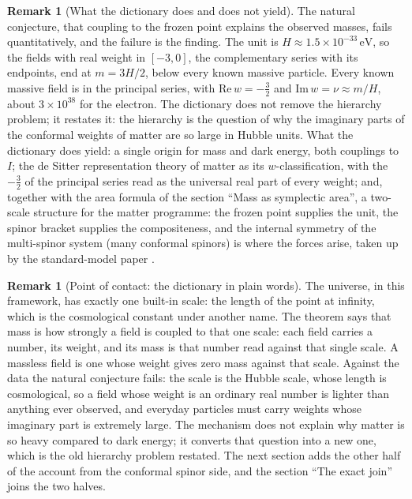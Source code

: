 \documentclass[11pt]{article}
\theoremstyle{definition}
\newtheorem{remark}[theorem]{Remark}
\theoremstyle{plain}
\newcommand{\changedmark}[2]{\marginpar{\raggedright\scriptsize\color{#1}#2}}
\begin{document}
\begin{remark}[What the dictionary does and does not yield]\label{c:note.mass.what-dictionary-does-does-not-yield}
\changedmark{gray}{reworded}
The natural conjecture, that coupling to the frozen point explains the observed masses, fails quantitatively, and the failure is the finding. The unit is $H \approx 1.5 \times 10^{-33}\,\mathrm{eV}$, so the fields with real weight in $[-3,0]$, the complementary series with its endpoints, end at $m = 3H/2$, below every known massive particle. Every known massive field is in the principal series, with $\mathrm{Re}\,w = -\tfrac32$ and $\mathrm{Im}\,w = \nu \approx m/H$, about $3 \times 10^{38}$ for the electron. The dictionary does not remove the hierarchy problem; it restates it: the hierarchy is the question of why the imaginary parts of the conformal weights of matter are so large in Hubble units. What the dictionary does yield: a single origin for mass and dark energy, both couplings to $I$; the de Sitter representation theory of matter as its $w$-classification, with the $-\tfrac32$ of the principal series read as the universal real part of every weight; and, together with the area formula of the section ``Mass as symplectic area'', a two-scale structure for the matter programme: the frozen point supplies the unit, the spinor bracket supplies the compositeness, and the internal symmetry of the multi-spinor system (many conformal spinors) is where the forces arise, taken up by the standard-model paper \cite{ButlerT12}.
\end{remark}

\begin{remark}[Point of contact: the dictionary in plain words]\label{c:note.mass.point-contact-dictionary-plain-words}
\changedmark{gray}{reworded}
The universe, in this framework, has exactly one built-in scale: the length of the point at infinity, which is the cosmological constant under another name. The theorem says that mass is how strongly a field is coupled to that one scale: each field carries a number, its weight, and its mass is that number read against that single scale. A massless field is one whose weight gives zero mass against that scale. Against the data the natural conjecture fails: the scale is the Hubble scale, whose length is cosmological, so a field whose weight is an ordinary real number is lighter than anything ever observed, and everyday particles must carry weights whose imaginary part is extremely large. The mechanism does not explain why matter is so heavy compared to dark energy; it converts that question into a new one, which is the old hierarchy problem restated. The next section adds the other half of the account from the conformal spinor side, and the section ``The exact join'' joins the two halves.
\end{remark}
\end{document}
